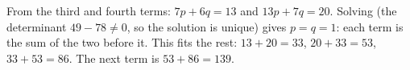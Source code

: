 From the third and fourth terms: $7p+6q=13$ and $13p+7q=20$. Solving (the determinant $49-78\ne0$, so the solution is unique) gives $p=q=1$: each term is the sum of the two before it. This fits the rest: $13+20=33$, $20+33=53$, $33+53=86$. The next term is $53+86=\boxed{139}$.
